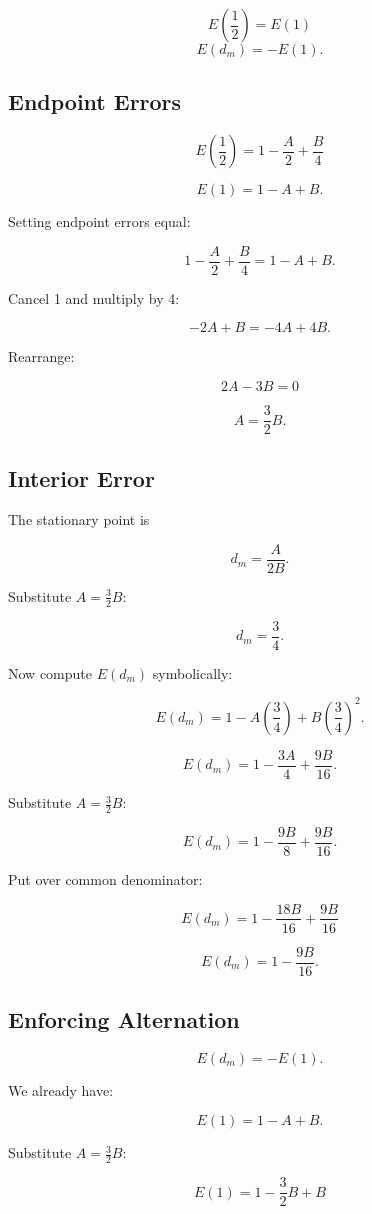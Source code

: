 \documentclass[12pt,a4paper]{article}
\begin{document}
\[
E\!\left(\frac12\right)=E(1)
\]
\[
E(d_m)=-E(1).
\]

\subsection*{Endpoint Errors}

\[
E\!\left(\frac12\right)
=1-\frac{A}{2}+\frac{B}{4}
\]

\[
E(1)=1-A+B.
\]

Setting endpoint errors equal:

\[
1-\frac{A}{2}+\frac{B}{4}
=
1-A+B.
\]

Cancel 1 and multiply by 4:

\[
-2A+B=-4A+4B.
\]

Rearrange:

\[
2A-3B=0
\]

\[
A=\frac{3}{2}B.
\]

\subsection*{Interior Error}

The stationary point is

\[
d_m=\frac{A}{2B}.
\]

Substitute $A=\frac32B$:

\[
d_m=\frac{3}{4}.
\]

Now compute $E(d_m)$ symbolically:

\[
E(d_m)
=1-A\left(\frac34\right)
+B\left(\frac34\right)^2.
\]

\[
E(d_m)
=1-\frac{3A}{4}
+\frac{9B}{16}.
\]

Substitute $A=\frac32B$:

\[
E(d_m)
=1-\frac{9B}{8}
+\frac{9B}{16}.
\]

Put over common denominator:

\[
E(d_m)
=1-\frac{18B}{16}
+\frac{9B}{16}
\]

\[
E(d_m)
=1-\frac{9B}{16}.
\]

\subsection*{Enforcing Alternation}

\[
E(d_m)=-E(1).
\]

We already have:

\[
E(1)=1-A+B.
\]

Substitute $A=\frac32B$:

\[
E(1)=1-\frac32B+B
\]
\end{document}
